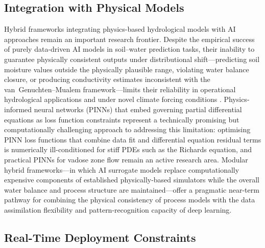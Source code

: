 \documentclass[land,article,submit,pdftex,moreauthors]{Definitions/mdpi}
\numberwithin{equation}{section}
\begin{document}
\subsection{Integration with Physical Models}

Hybrid frameworks integrating physics-based hydrological models with AI approaches remain an important research frontier. Despite the empirical success of purely data-driven AI models in soil--water prediction tasks, their inability to guarantee physically consistent outputs under distributional shift---predicting soil moisture values outside the physically plausible range, violating water balance closure, or producing conductivity estimates inconsistent with the van~Genuchten--Mualem framework---limits their reliability in operational hydrological applications and under novel climate forcing conditions \citep{willard2022integrating}. Physics-informed neural networks (PINNs) that embed governing partial differential equations as loss function constraints represent a technically promising but computationally challenging approach to addressing this limitation: optimising PINN loss functions that combine data fit and differential equation residual terms is numerically ill-conditioned for stiff PDEs such as the Richards equation, and practical PINNs for vadose zone flow remain an active research area. Modular hybrid frameworks---in which AI surrogate models replace computationally expensive components of established physically-based simulators while the overall water balance and process structure are maintained---offer a pragmatic near-term pathway for combining the physical consistency of process models with the data assimilation flexibility and pattern-recognition capacity of deep learning.

\subsection{Real-Time Deployment Constraints}
\end{document}
